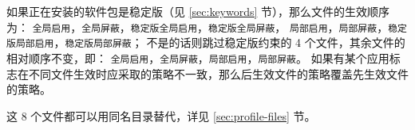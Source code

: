 如果正在安装的软件包是稳定版（见 \ref{sec:keywords} 节），那么文件的生效顺序为：
\texttt{全局启用}，\texttt{全局屏蔽}，\texttt{稳定版全局启用}，\texttt{稳定版全局屏蔽}，
\texttt{局部启用}，\texttt{局部屏蔽}，\texttt{稳定版局部启用}，\texttt{稳定版局部屏蔽}；
不是的话则跳过稳定版约束的 4 个文件，其余文件的相对顺序不变，即：
\texttt{全局启用}，\texttt{全局屏蔽}，\texttt{局部启用}，\texttt{局部屏蔽}。
如果有某个应用标志在不同文件生效时应采取的策略不一致，那么后生效文件的策略覆盖先生效文件的策略。

这 8 个文件都可以用同名目录替代，详见 \ref{sec:profile-files} 节。




